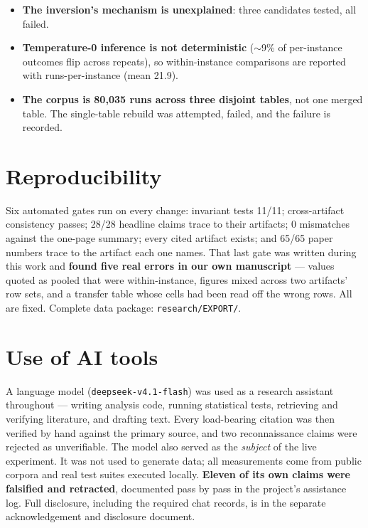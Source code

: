 \documentclass[10pt]{article}
\newcommand{\code}[1]{\texttt{\small #1}}
\begin{document}
\begin{itemize}[leftmargin=1.3em,itemsep=1pt]
  only comparisons that reach significance involve the masked condition (withholding the failure
  location costs $0.275$, $p = 0.015$). Both runtime interventions point the right way
  ($+0.189$ for the hint, $+0.199$ for the forced re-check) but neither is individually significant
  ($p = 0.125$, $p = 0.084$), and the content-free control is not distinguishable from the
  instruction it controls for ($p = 0.383$). The experiment is reported as \emph{suggestive of the
  interventions and conclusive only about the benchmark}.
\item \textbf{The inversion's mechanism is unexplained}: three candidates tested, all failed.
\item \textbf{Temperature-0 inference is not deterministic} ($\sim$9\% of per-instance outcomes flip
  across repeats), so within-instance comparisons are reported with runs-per-instance (mean 21.9).
\item \textbf{The corpus is 80{,}035 runs across three disjoint tables}, not one merged table. The
  single-table rebuild was attempted, failed, and the failure is recorded.
\end{itemize}

\section{Reproducibility}

Six automated gates run on every change: invariant tests 11/11; cross-artifact consistency passes;
28/28 headline claims trace to their artifacts; 0 mismatches against the one-page summary; every
cited artifact exists; and 65/65 paper numbers trace to the artifact each one names. That last gate
was written during this work and \textbf{found five real errors in our own manuscript} --- values
quoted as pooled that were within-instance, figures mixed across two artifacts' row sets, and a
transfer table whose cells had been read off the wrong rows. All are fixed. Complete data package:
\code{research/EXPORT/}.

\section{Use of AI tools}

A language model (\code{deepseek-v4.1-flash}) was used as a research assistant throughout ---
writing analysis code, running statistical tests, retrieving and verifying literature, and drafting
text. Every load-bearing citation was then verified by hand against the primary source, and two
reconnaissance claims were rejected as unverifiable. The model also served as the \emph{subject} of
the live experiment. It was not used to generate data; all measurements come from public corpora and
real test suites executed locally. \textbf{Eleven of its own claims were falsified and retracted},
documented pass by pass in the project's assistance log. Full disclosure, including the required
chat records, is in the separate acknowledgement and disclosure document.
\end{document}
